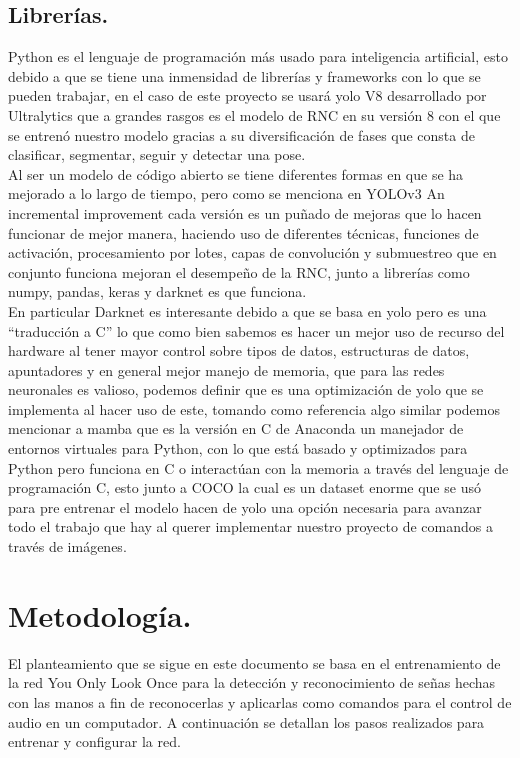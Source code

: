 \documentclass[a4paper, 12pt]{article}
\begin{document}
    \subsection{Librerías.}
    Python es el lenguaje de programación más usado para inteligencia artificial, esto debido a que se tiene una inmensidad de librerías y frameworks con lo que se pueden trabajar, en el caso de este proyecto se usará yolo V8 desarrollado por Ultralytics que a grandes rasgos es el modelo de RNC en su versión 8 con el que se entrenó nuestro modelo gracias a su diversificación de fases que consta de clasificar, segmentar, seguir y detectar una pose.\\ 
    Al ser un modelo de código abierto se tiene diferentes formas en que se ha mejorado a lo largo de tiempo, pero como se menciona en YOLOv3 An incremental improvement\cite{redmon2018yolov3} cada versión es un puñado de mejoras que lo hacen funcionar de mejor manera, haciendo uso de diferentes técnicas, funciones de activación, procesamiento por lotes, capas de convolución y submuestreo que en conjunto funciona mejoran el desempeño de la RNC, junto a librerías como numpy, pandas, keras y darknet es que funciona.\\ 
    En particular Darknet es interesante debido a que se basa en yolo pero es una “traducción a C” lo que como bien sabemos es hacer un mejor uso de recurso del hardware al tener mayor control sobre tipos de datos, estructuras de datos, apuntadores y en general mejor manejo de memoria, que para las redes neuronales es valioso, podemos definir que es una optimización de yolo que se implementa al hacer uso de este, tomando como referencia algo similar podemos mencionar a mamba que es la versión en C de Anaconda un manejador de entornos virtuales para Python, con lo que está basado y optimizados para Python pero funciona en C o interactúan con  la memoria a través del lenguaje de programación C, esto junto a COCO la cual es un dataset enorme que se usó para pre entrenar el modelo hacen de yolo una opción necesaria para avanzar todo el trabajo que hay al querer implementar nuestro proyecto de comandos a través de imágenes. 
    \clearpage

    \section{Metodología.}
    El planteamiento que se sigue en este documento se basa en el entrenamiento de la red You Only Look Once para la detección y reconocimiento de señas hechas con las manos a fin de reconocerlas y aplicarlas como comandos para el control de audio en un computador. A continuación se detallan los pasos realizados para entrenar y configurar la red.
\end{document}
